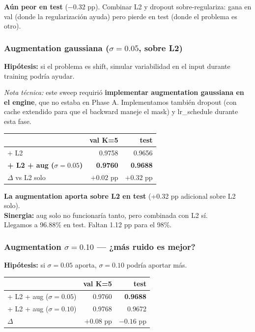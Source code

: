 \documentclass[11pt,a4paper]{article}
\newcommand{\winner}[1]{\cellcolor{accent2!15}\textbf{#1}}
\begin{document}
\begin{sorpresa}
\textbf{Aún peor en test} ($-0.32$ pp). Combinar L2 y dropout sobre-regulariza: gana en val (donde la regularización ayuda) pero pierde en test (donde el problema es otro).
\end{sorpresa}

\subsubsection{Augmentation gaussiana ($\sigma = 0.05$, sobre L2)}

\textbf{Hipótesis:} si el problema es shift, simular variabilidad en el input durante training podría ayudar.

\textit{Nota técnica:} este sweep requirió \textbf{implementar augmentation gaussiana en el engine}, que no estaba en Phase A. Implementamos también dropout (con cache extendido para que el backward maneje el mask) y lr\_schedule durante esta fase.

\begin{center}
\small
\begin{tabular}{@{}lrr@{}}
\toprule
& \textbf{val K=5} & \textbf{test} \\
\midrule
+ L2                       & 0.9758 & 0.9656 \\
\winner{+ L2 + aug ($\sigma=0.05$)} & \winner{0.9760} & \winner{0.9688} \\
$\Delta$ vs L2 solo        & $+0.02$ pp & $+0.32$ pp \\
\bottomrule
\end{tabular}
\end{center}

\begin{aprendimos}
\textbf{La augmentation aporta sobre L2 en test} (+0.32 pp adicional sobre L2 solo). \\[0.2em]
\textbf{Sinergia:} aug solo no funcionaría tanto, pero combinada con L2 sí. \\[0.2em]
Llegamos a 96.88\% en test. Faltan 1.12 pp para el 98\%.
\end{aprendimos}

\subsubsection{Augmentation $\sigma = 0.10$ — ¿más ruido es mejor?}

\textbf{Hipótesis:} si $\sigma=0.05$ aporta, $\sigma=0.10$ podría aportar más.

\begin{center}
\small
\begin{tabular}{@{}lrr@{}}
\toprule
& \textbf{val K=5} & \textbf{test} \\
\midrule
+ L2 + aug ($\sigma=0.05$) & 0.9760 & \textbf{0.9688} \\
+ L2 + aug ($\sigma=0.10$) & 0.9768 & 0.9672 \\
$\Delta$                   & $+0.08$ pp & $-0.16$ pp \\
\bottomrule
\end{tabular}
\end{center}
\end{document}
